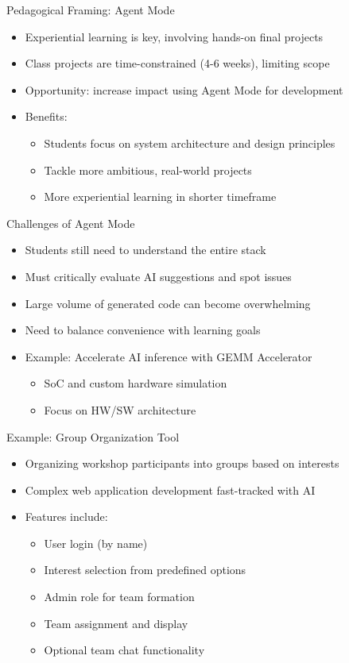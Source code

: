 \documentclass[xcolor=dvipsnames, aspectratio=169]{beamer}
\begin{document}
\begin{frame}{Pedagogical Framing: Agent Mode}
  \begin{itemize}
    \item Experiential learning is key, involving hands-on final projects
    \item Class projects are time-constrained (4-6 weeks), limiting scope
    \item Opportunity: increase impact using Agent Mode for development
    \item Benefits:
      \begin{itemize}
        \item Students focus on system architecture and design principles
        \item Tackle more ambitious, real-world projects
        \item More experiential learning in shorter timeframe
      \end{itemize}
  \end{itemize}
\end{frame}

\begin{frame}{Challenges of Agent Mode}
  \begin{itemize}
    \item Students still need to understand the entire stack
    \item Must critically evaluate AI suggestions and spot issues
    \item Large volume of generated code can become overwhelming
    \item Need to balance convenience with learning goals
    \item Example: Accelerate AI inference with GEMM Accelerator 
      \begin{itemize}
        \item SoC and custom hardware simulation
        \item Focus on HW/SW architecture
      \end{itemize}
  \end{itemize}
\end{frame}

\begin{frame}{Example: Group Organization Tool}
  \begin{itemize}
    \item Organizing workshop participants into groups based on interests
    \item Complex web application development fast-tracked with AI
    \item Features include:
      \begin{itemize}
        \item User login (by name)
        \item Interest selection from predefined options
        \item Admin role for team formation
        \item Team assignment and display
        \item Optional team chat functionality
      \end{itemize}
  \end{itemize}
\end{frame}
\end{document}
